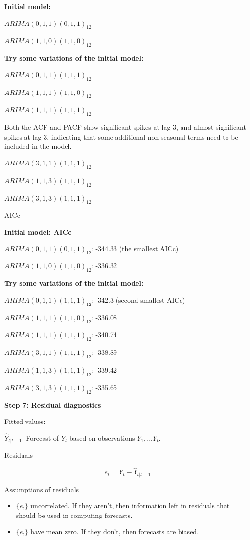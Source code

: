 \documentclass[
  11pt,
  a4paper,
]{report}
\providecommand{\tightlist}{%
  \setlength{\itemsep}{0pt}\setlength{\parskip}{0pt}}\usepackage{longtable,booktabs,array}
\begin{document}
\textbf{Initial model:}

\(ARIMA(0,1,1)(0,1,1)_{12}\)

\(ARIMA(1,1,0)(1,1,0)_{12}\)

\textbf{Try some variations of the initial model:}

\(ARIMA(0,1,1)(1,1,1)_{12}\)

\(ARIMA(1,1,1)(1,1,0)_{12}\)

\(ARIMA(1,1,1)(1,1,1)_{12}\)

Both the ACF and PACF show significant spikes at lag 3, and almost
significant spikes at lag 3, indicating that some additional
non-seasonal terms need to be included in the model.

\(ARIMA(3,1,1)(1,1,1)_{12}\)

\(ARIMA(1,1,3)(1,1,1)_{12}\)

\(ARIMA(3,1,3)(1,1,1)_{12}\)

AICc

\textbf{Initial model: AICc}

\(ARIMA(0,1,1)(0,1,1)_{12}\): -344.33 (the smallest AICc)

\(ARIMA(1,1,0)(1,1,0)_{12}\): -336.32

\textbf{Try some variations of the initial model:}

\(ARIMA(0,1,1)(1,1,1)_{12}\): -342.3 (second smallest AICc)

\(ARIMA(1,1,1)(1,1,0)_{12}\): -336.08

\(ARIMA(1,1,1)(1,1,1)_{12}\): -340.74

\(ARIMA(3,1,1)(1,1,1)_{12}\): -338.89

\(ARIMA(1,1,3)(1,1,1)_{12}\): -339.42

\(ARIMA(3,1,3)(1,1,1)_{12}\): -335.65

\textbf{Step 7: Residual diagnostics}

Fitted values:

\(\hat{Y}_{t|t-1}\): Forecast of \(Y_t\) based on observations
\(Y_1,...Y_t\).

Residuals

\[e_t=Y_t - \hat{Y}_{t|t-1}\]

Assumptions of residuals

\begin{itemize}
\tightlist
\item
  \(\{e_t\}\) uncorrelated. If they aren't, then information left in
  residuals that should be used in computing forecasts.
\end{itemize}

\begin{itemize}
\tightlist
\item
  \(\{e_t\}\) have mean zero. If they don't, then forecasts are biased.
\end{itemize}
\end{document}
